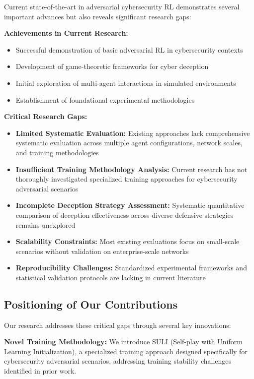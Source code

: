 \documentclass[11pt]{article}
\theoremstyle{definition}
\theoremstyle{plain}
\begin{document}
Current state-of-the-art in adversarial cybersecurity RL demonstrates several important advances but also reveals significant research gaps:

\textbf{Achievements in Current Research:}
\begin{itemize}
\item Successful demonstration of basic adversarial RL in cybersecurity contexts
\item Development of game-theoretic frameworks for cyber deception
\item Initial exploration of multi-agent interactions in simulated environments
\item Establishment of foundational experimental methodologies
\end{itemize}

\textbf{Critical Research Gaps:}
\begin{itemize}
\item \textbf{Limited Systematic Evaluation:} Existing approaches lack comprehensive systematic evaluation across multiple agent configurations, network scales, and training methodologies
\item \textbf{Insufficient Training Methodology Analysis:} Current research has not thoroughly investigated specialized training approaches for cybersecurity adversarial scenarios
\item \textbf{Incomplete Deception Strategy Assessment:} Systematic quantitative comparison of deception effectiveness across diverse defensive strategies remains unexplored
\item \textbf{Scalability Constraints:} Most existing evaluations focus on small-scale scenarios without validation on enterprise-scale networks
\item \textbf{Reproducibility Challenges:} Standardized experimental frameworks and statistical validation protocols are lacking in current literature
\end{itemize}

\subsection{Positioning of Our Contributions}

Our research addresses these critical gaps through several key innovations:

\textbf{Novel Training Methodology:} We introduce SULI (Self-play with Uniform Learning Initialization), a specialized training approach designed specifically for cybersecurity adversarial scenarios, addressing training stability challenges identified in prior work.
\end{document}
